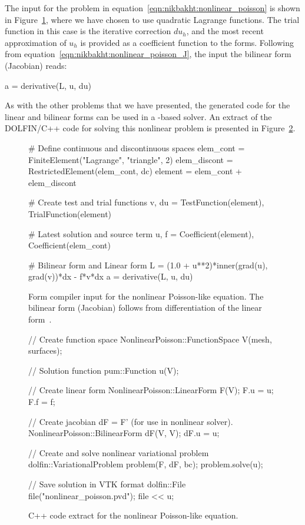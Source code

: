 The \ufl{} input for the problem in
equation~\eqref{eqn:nikbakht:nonlinear_poisson} is shown in
Figure~\ref{fig:nikbakht:ufl_nonlinear_poisson}, where we have chosen
to use quadratic Lagrange functions.  The trial function in this case is
the iterative correction $du_{h}$, and the most recent approximation of
$u_{h}$ is provided as a coefficient function to the forms.  Following
from equation~\eqref{eqn:nikbakht:nonlinear_poisson_J}, the \ufl{}
input the bilinear form (Jacobian) reads:
%
\begin{python}
a = derivative(L, u, du)
\end{python}
%
As with the other problems that we have presented, the generated code for
the linear and bilinear forms can be used in a \dolfin{}-based solver.
An extract of the DOLFIN/C++ code for solving this nonlinear problem is
presented in Figure~\ref{fig:nikbakht:c++_nonlinear_poisson}.

\begin{figure}
\begin{python}
# Define continuous and discontinuous spaces
elem_cont    = FiniteElement("Lagrange", "triangle", 2)
elem_discont = RestrictedElement(elem_cont, dc)
element      = elem_cont + elem_discont

# Create test and trial functions
v, du = TestFunction(element), TrialFunction(element)

# Latest solution and source term
u, f = Coefficient(element), Coefficient(elem_cont)

# Bilinear form and Linear form
L = (1.0 + u**2)*inner(grad(u), grad(v))*dx - f*v*dx
a = derivative(L, u, du)
\end{python}
\caption{Form compiler input for the nonlinear Poisson-like equation. The bilinear
form (Jacobian) follows from differentiation of the linear form~.}
\label{fig:nikbakht:ufl_nonlinear_poisson}
\end{figure}

\begin{figure}
\begin{c++}
// Create function space
NonlinearPoisson::FunctionSpace V(mesh, surfaces);

// Solution function
pum::Function u(V);

// Create linear form
NonlinearPoisson::LinearForm F(V);
F.u = u; F.f = f;

// Create jacobian dF = F' (for use in nonlinear solver).
NonlinearPoisson::BilinearForm dF(V, V);
dF.u = u;

// Create and solve nonlinear variational problem
dolfin::VariationalProblem problem(F, dF, bc);
problem.solve(u);

// Save solution in VTK format
dolfin::File file("nonlinear_poisson.pvd");
file << u;
\end{c++}
\caption{C++ code extract for the nonlinear Poisson-like equation.}
\label{fig:nikbakht:c++_nonlinear_poisson}
\end{figure}


